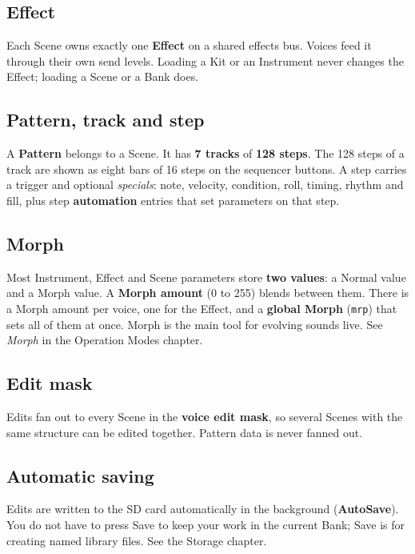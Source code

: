 \subsection{Effect}\label{effect}

Each Scene owns exactly one \textbf{Effect} on a shared effects bus.
Voices feed it through their own send levels. Loading a Kit or an
Instrument never changes the Effect; loading a Scene or a Bank does.

\subsection{Pattern, track and step}\label{pattern-track-and-step}

A \textbf{Pattern} belongs to a Scene. It has \textbf{7 tracks} of
\textbf{128 steps}. The 128 steps of a track are shown as eight bars of
16 steps on the sequencer buttons. A step carries a trigger and optional
\emph{specials}: note, velocity, condition, roll, timing, rhythm and
fill, plus step \textbf{automation} entries that set parameters on that
step.

\subsection{Morph}\label{morph}

Most Instrument, Effect and Scene parameters store \textbf{two values}:
a Normal value and a Morph value. A \textbf{Morph amount} (0 to 255)
blends between them. There is a Morph amount per voice, one for the
Effect, and a \textbf{global Morph} (\texttt{mrp}) that sets all of them
at once. Morph is the main tool for evolving sounds live. See
\emph{Morph} in the Operation Modes chapter.

\subsection{Edit mask}\label{edit-mask}

Edits fan out to every Scene in the \textbf{voice edit mask}, so several
Scenes with the same structure can be edited together. Pattern data is
never fanned out.

\subsection{Automatic saving}\label{automatic-saving}

Edits are written to the SD card automatically in the background
(\textbf{AutoSave}). You do not have to press Save to keep your work in
the current Bank; Save is for creating named library files. See the
Storage chapter.

